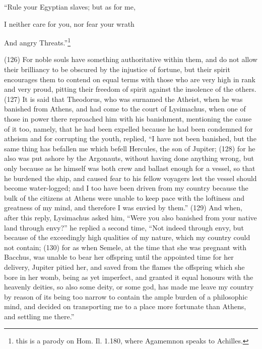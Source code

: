 ``Rule your Egyptian slaves; but as for me,

I neither care for you, nor fear your wrath

And angry Threats.''\footnote{this is a parody on Hom. Il. 1.180, where Agamemnon speaks to Achilles.}

(126) For noble souls have something authoritative within them, and do not allow their brilliancy to
be obscured by the injustice of fortune, but their spirit encourages them to contend on equal terms
with those who are very high in rank and very proud, pitting their freedom of spirit against the
insolence of the others. (127) It is said that Theodorus, who was surnamed the Atheist, when he
was banished from Athens, and had come to the court of Lysimachus, when one of those in power
there reproached him with his banishment, mentioning the cause of it too, namely, that he had been
expelled because he had been condemned for atheism and for corrupting the youth, replied, ``I
have not been banished, but the same thing has befallen me which befell Hercules, the son of
Jupiter; (128) for he also was put ashore by the Argonauts, without having done anything wrong,
but only because as he himself was both crew and ballast enough for a vessel, so that he
burdened the ship, and caused fear to his fellow voyagers lest the vessel should become
water-logged; and I too have been driven from my country because the bulk of the citizens at
Athens were unable to keep pace with the loftiness and greatness of my mind, and therefore I was
envied by them.'' (129) And when, after this reply, Lysimachus asked him, ``Were you also
banished from your native land through envy?'' he replied a second time, ``Not indeed through envy,
but because of the exceedingly high qualities of my nature, which my country could not contain;
(130) for as when Semele, at the time that she was pregnant with Bacchus, was unable to bear her
offspring until the appointed time for her delivery, Jupiter pitied her, and saved from the flames the
offspring which she bore in her womb, being as yet imperfect, and granted it equal honours with the
heavenly deities, so also some deity, or some god, has made me leave my country by reason of its
being too narrow to contain the ample burden of a philosophic mind, and decided on transporting
me to a place more fortunate than Athens, and settling me there.''

